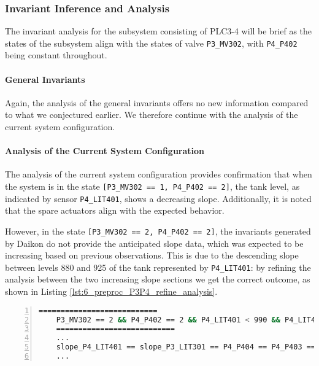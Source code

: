 \subsubsection{Invariant Inference and Analysis}
\label{subsubsec:6_P3P4_invariants}
The invariant analysis for the subsystem consisting of PLC3-4 will be brief as the states of the subsystem align with the states of valve \texttt{P3\_MV302}, with \texttt{P4\_P402} being constant throughout.

\paragraph{General Invariants}
\label{par:6_P3P4_general_invariant}
Again, the analysis of the general invariants offers no new information compared to what we conjectured earlier. We therefore continue with the analysis of the current system configuration.

\paragraph{Analysis of the Current System Configuration}
\label{par:6_P3P4_current_system_conf}
The analysis of the current system configuration provides confirmation that when the system is in the state \texttt{[P3\_MV302 == 1, P4\_P402 == 2]}, the tank level, as indicated by sensor \texttt{P4\_LIT401}, shows a decreasing slope. Additionally, it is noted that the spare actuators align with the expected behavior. 

However, in the state \texttt{[P3\_MV302 == 2, P4\_P402 == 2]}, the invariants generated by Daikon do not provide the anticipated slope data, which was expected to be increasing based on previous observations. This is due to the descending slope between levels 880 and 925 of the tank represented by \texttt{P4\_LIT401}: by refining the analysis between the two increasing slope sections we get the correct outcome, as shown in Listing \ref{lst:6_preproc_P3P4_refine_analysis}.

\begin{lstlisting}[language=bash, numbers=left, caption=Daikon manual analysis for \texttt{P3\_MV302 == 2}, label=lst:6_preproc_P3P4_refine_analysis]
	===========================
	P3_MV302 == 2 && P4_P402 == 2 && P4_LIT401 < 990 && P4_LIT401 > 930
	===========================
	...
	slope_P4_LIT401 == slope_P3_LIT301 == P4_P404 == P4_P403 == P4_P401 == P3_P301 == P3_MV304 == P3_MV303 == P3_MV301 == 1.0
	...
\end{lstlisting}


